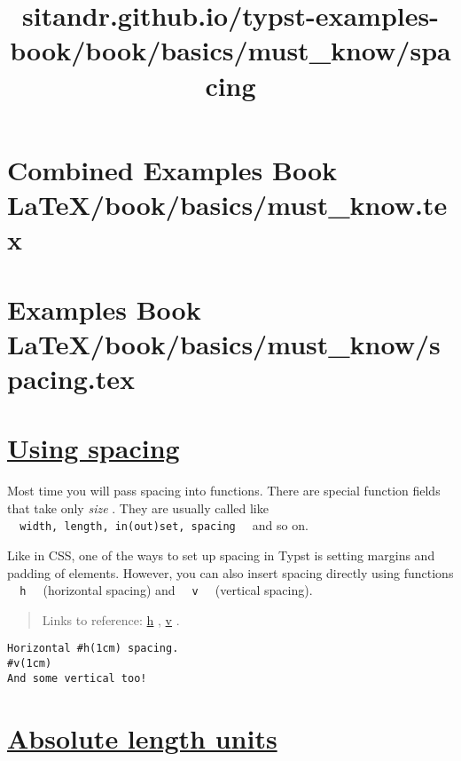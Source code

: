 \pandocbounded{}




\section{Combined Examples Book LaTeX/book/basics/must_know.tex}
\section{Examples Book LaTeX/book/basics/must_know/spacing.tex}
\title{sitandr.github.io/typst-examples-book/book/basics/must_know/spacing}

\section{\texorpdfstring{\hyperref[using-spacing]{Using
spacing}}{Using spacing}}\label{using-spacing}

Most time you will pass spacing into functions. There are special
function fields that take only \emph{size} . They are usually called
like
\texttt{\ }{\texttt{\ width,\ length,\ in(out)set,\ spacing\ }}\texttt{\ }
and so on.

Like in CSS, one of the ways to set up spacing in Typst is setting
margins and padding of elements. However, you can also insert spacing
directly using functions \texttt{\ }{\texttt{\ h\ }}\texttt{\ }
(horizontal spacing) and \texttt{\ }{\texttt{\ v\ }}\texttt{\ }
(vertical spacing).

\begin{quote}
Links to reference: \href{https://typst.app/docs/reference/layout/h/}{h}
, \href{https://typst.app/docs/reference/layout/v/}{v} .
\end{quote}

\begin{verbatim}
Horizontal #h(1cm) spacing.
#v(1cm)
And some vertical too!
\end{verbatim}

\pandocbounded{}

\section{\texorpdfstring{\hyperref[absolute-length-units]{Absolute
length units}}{Absolute length units}}\label{absolute-length-units}


